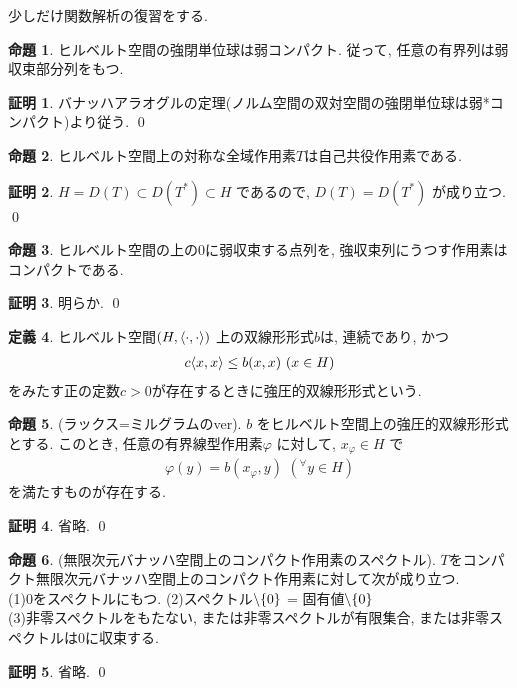\documentclass[twocolumn, landscape, a4paper , 8pt, fleqn, titlepage ]{jsarticle}
\theoremstyle{definition}
\newtheorem{dfn}{定義}[section]
\newtheorem{prop}[dfn]{命題}
\newtheorem*{pf*}{証明}
\newcommand{\any}{{}^{\forall}}
\newcommand{\cbra}[1]{\mleft\{#1\mright\}}
\newcommand{\tbra}[1]{\mleft\langle#1\mright\rangle}
\renewcommand{\-}{\hyphen}
\begin{document}
少しだけ関数解析の復習をする.

\begin{prop}
ヒルベルト空間の強閉単位球は弱コンパクト. 従って, 任意の有界列は弱収束部分列をもつ.
\end{prop}
\begin{pf*}
バナッハアラオグルの定理(ノルム空間の双対空間の強閉単位球は弱*コンパクト)より従う.
\qed
\end{pf*}

\begin{prop}
ヒルベルト空間上の対称な全域作用素$T$は自己共役作用素である.
\end{prop}
\begin{pf*}
$H = D(T) \subset D(T^*) \subset H$ であるので, $D(T) = D(T^*)$ が成り立つ. 
\qed
\end{pf*}

\begin{prop}
ヒルベルト空間の上の$0$に弱収束する点列を, 強収束列にうつす作用素はコンパクトである.
\end{prop}
\begin{pf*}
明らか.
\qed
\end{pf*}

\begin{dfn}
ヒルベルト空間$(H, \tbra{\cdot,\cdot})$ 上の双線形形式$b$は, 連続であり, かつ
\begin{align*} c \tbra{x,x} \leq b(x,x) \,\, (x \in H) \end{align*}
をみたす正の定数$c>0$が存在するときに強圧的双線形形式という. 
\end{dfn}

\begin{prop}(ラックス=ミルグラムのver).
$b$ をヒルベルト空間上の強圧的双線形形式とする. このとき, 任意の有界線型作用素$\varphi $ に対して, $x_\varphi \in H$ で
\begin{align*} \varphi(y) = b(x_\varphi , y) \,\, (\any y \in H)\end{align*}
を満たすものが存在する. 
\end{prop}
\begin{pf*}
省略.
\qed
\end{pf*}

\begin{prop}(無限次元バナッハ空間上のコンパクト作用素のスペクトル).
$T$をコンパクト無限次元バナッハ空間上のコンパクト作用素に対して次が成り立つ. \\
(1)$0$をスペクトルにもつ.
(2)スペクトル$\setminus \cbra{0}$ = 固有値$\setminus \cbra{0}$ \\
(3)非零スペクトルをもたない, または非零スペクトルが有限集合, または非零スペクトルは$0$に収束する. 
\end{prop}
\begin{pf*}
省略.
\qed
\end{pf*}
\end{document}
